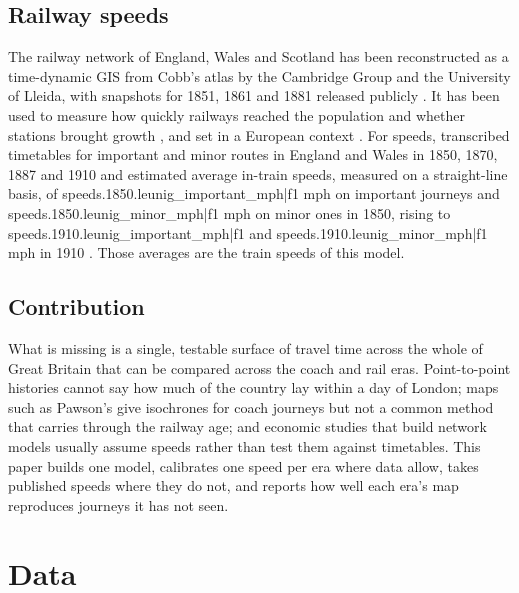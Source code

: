 \subsection{Railway speeds}
The railway network of England, Wales and Scotland has been reconstructed as a time-dynamic GIS from Cobb's atlas by the Cambridge Group and the University of Lleida, with snapshots for 1851, 1861 and 1881 released publicly \citep{marti2017,satchell2023}. It has been used to measure how quickly railways reached the population and whether stations brought growth \citep{gregory2010,bogart2022}, and set in a European context \citep{marti2013}. For speeds, \citet{leunig2006} transcribed timetables for important and minor routes in England and Wales in 1850, 1870, 1887 and 1910 and estimated average in-train speeds, measured on a straight-line basis, of {{speeds.1850.leunig_important_mph|f1}} mph on important journeys and {{speeds.1850.leunig_minor_mph|f1}} mph on minor ones in 1850, rising to {{speeds.1910.leunig_important_mph|f1}} and {{speeds.1910.leunig_minor_mph|f1}} mph in 1910 \citep[Table~2]{leunig2006}. Those averages are the train speeds of this model.

\subsection{Contribution}
What is missing is a single, testable surface of travel time across the whole of Great Britain that can be compared across the coach and rail eras. Point-to-point histories cannot say how much of the country lay within a day of London; maps such as Pawson's give isochrones for coach journeys but not a common method that carries through the railway age; and economic studies that build network models usually assume speeds rather than test them against timetables. This paper builds one model, calibrates one speed per era where data allow, takes published speeds where they do not, and reports how well each era's map reproduces journeys it has not seen.

\section{Data}\label{sec:data}
